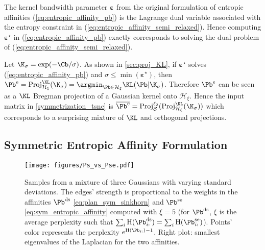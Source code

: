 \begin{remark}
  The kernel bandwidth parameter $\bm{\varepsilon}$ from the original formulation of entropic affinities (\ref{eq:entropic_affinity_pb}) is the Lagrange dual variable associated with the entropy constraint in (\ref{eq:entropic_affinity_semi_relaxed}). Hence computing $\bm{\varepsilon}^\star$ in (\ref{eq:entropic_affinity_pb}) exactly corresponds to solving the dual problem of (\ref{eq:entropic_affinity_semi_relaxed}).
\end{remark}

\begin{remark}\label{Pe_proj}
  Let $\K_{\sigma} = \exp(-\Cb/\sigma)$. As shown in \cref{sec:proj_KL}, if $\bm{\varepsilon}^\star$ solves (\ref{eq:entropic_affinity_pb}) and $\sigma \leq \min(\bm{\varepsilon}^\star)$, then $\Pb^{\mathrm{e}} = \operatorname{Proj}^{\operatorname{\KL}}_{\mathcal{H}_{\xi}}(\K_{\sigma})  =  \argmin_{\Pb \in \mathcal{H}_{\xi}} \KL(\Pb | \K_\sigma)$.
  Therefore $\Pb^{\mathrm{e}}$ can be seen as a $\KL$ Bregman projection \cite{benamou2015iterative} of a Gaussian kernel onto $\mathcal{H}_{\xi}$. Hence the input matrix in \eqref{symmetrization_tsne}  is $\overline{\Pb^{\mathrm{e}}}= \operatorname{Proj}^{\ell_2}_{\mathcal{S}}(\operatorname{Proj}^{\operatorname{\KL}}_{\mathcal{H}_{\xi}}(\K_\sigma))$ which corresponds to a surprising mixture of $\KL$ and orthogonal projections.
\end{remark}

\subsection{Symmetric Entropic Affinity Formulation}\label{subsec:sea}

\begin{figure*}[t]
  \begin{center}
  \centerline{\texttt{[image: figures/Ps\_vs\_Pse.pdf]}}
  \caption{Samples from a mixture of three Gaussians with varying standard deviations. The edges' strength is proportional to the weights in the affinities $\Pb^{\mathrm{ds}}$ \eqref{eq:plan_sym_sinkhorn} and $\Pb^{\mathrm{se}}$ \eqref{eq:sym_entropic_affinity} computed with $\xi=5$ (for $\Pb^{\mathrm{ds}}$, $\xi$ is the average perplexity such that $\sum_i \operatorname{H}(\Pb^{\mathrm{ds}}_{i:})=\sum_i \operatorname{H}(\Pb^{\mathrm{se}}_{i:})$). Points' color represents the perplexity $e^{\operatorname{H}(\Pb_{i:})-1}$. Right plot: smallest eigenvalues of the Laplacian for the two affinities.}
  \label{fig:Ps_vs_Pse}
  \end{center}
\end{figure*}

